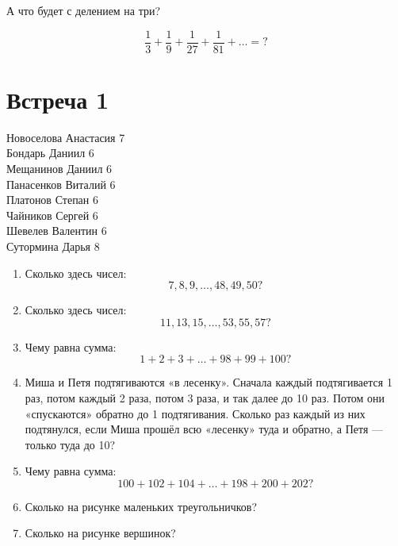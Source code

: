 \documentclass[a4paper, 12pt]{article}
\begin{document}
А что будет с делением на три?

\[
  \frac{1}{3} + \frac{1}{9} + \frac{1}{27} + \frac{1}{81} + \ldots = ?
\]


\section{Встреча 1}


Новоселова Анастасия 7 \\
Бондарь Даниил 6 \\
Мещанинов Даниил 6 \\
Панасенков Виталий 6 \\
Платонов Степан 6 \\
Чайников Сергей 6 \\
Шевелев Валентин 6 \\
Сутормина Дарья 8 \\

\newpage
\begin{enumerate}

  \item Сколько здесь чисел: 
    \[
    7, 8, 9, \ldots, 48, 49, 50?
  \]
  \item Сколько здесь чисел: 
    \[
      11, 13, 15, \ldots, 53, 55, 57?
    \]
  \item Чему равна сумма: 
    \[
    1 + 2 + 3 + \ldots + 98 + 99 + 100?
    \]
  \item Миша и Петя подтягиваются «в лесенку». Сначала каждый подтягивается 1 раз, потом каждый 2 раза, потом 3 раза, и так далее до 10 раз. Потом они «спускаются» обратно до 1 подтягивания. Сколько раз каждый из них подтянулся, если Миша прошёл всю «лесенку» туда и обратно, а Петя — только туда до 10?
  \item 
 Чему равна сумма: 
    \[
    100 + 102 + 104 + \ldots + 198 + 200 + 202?
    \]
  \item Сколько на рисунке маленьких треугольничков?


\newcommand*\rows{10}

  \item Сколько на рисунке вершинок?




\end{enumerate}
\end{document}
